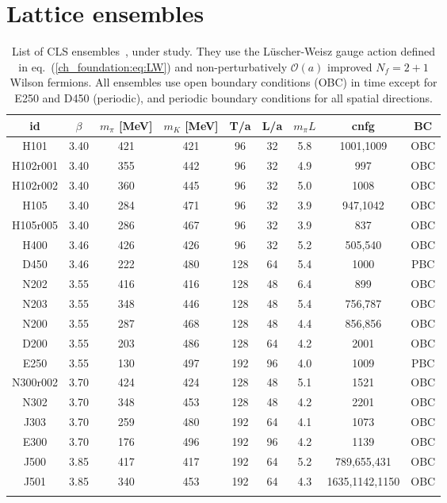 
\chapter{Lattice ensembles}
\label{apex_ensembles}

\begin{longtable}{c c c c c c c c c}
\label{apex_ensembles:tab:ens}
    id & $\beta$ & $m_{\pi}$ [MeV] & $m_K$ [MeV] & T/a & L/a & $m_{\pi}L$ & cnfg & BC\\
    \toprule
    H101 & 3.40 & 421 & 421 & 96 & 32 & 5.8 & 1001,1009 & OBC \\
    H102r001 & 3.40 & 355 & 442 & 96 & 32 & 4.9 & 997 & OBC \\
    H102r002 & 3.40 & 360 & 445 & 96 & 32 & 5.0 & 1008 & OBC \\
    H105 & 3.40 & 284 & 471 & 96 & 32 & 3.9 & 947,1042 & OBC \\
    H105r005 & 3.40 & 286 & 467 & 96 & 32 & 3.9 & 837 & OBC \\
\midrule
    H400 & 3.46 & 426 & 426 & 96 & 32 & 5.2 & 505,540 & OBC \\
    D450 & 3.46 & 222 & 480 & 128 & 64 & 5.4 & 1000 & PBC \\
\midrule
    N202 & 3.55 & 416 & 416 & 128 & 48 & 6.4 & 899 & OBC \\
    N203 & 3.55 & 348 & 446 & 128 & 48 & 5.4 & 756,787 & OBC \\
    N200 & 3.55 & 287 & 468 & 128 & 48 & 4.4 & 856,856 & OBC \\
    D200 & 3.55 & 203 & 486 & 128 & 64 & 4.2 & 2001 & OBC \\
    E250 & 3.55 & 130 & 497 & 192 & 96 & 4.0 & 1009 & PBC\\
\midrule
    N300r002 & 3.70 & 424 & 424 & 128 & 48 & 5.1 & 1521 & OBC \\
    N302 & 3.70 & 348 & 453 & 128 & 48 & 4.2 & 2201 & OBC \\
    J303 & 3.70 & 259 & 480 & 192 & 64 & 4.1 & 1073 & OBC \\
    E300 & 3.70 & 176 & 496 & 192 & 96 & 4.2 & 1139 & OBC \\ 
\midrule
    J500 & 3.85 & 417 & 417 & 192 & 64 & 5.2 & 789,655,431 & OBC \\
    J501 & 3.85 & 340 & 453 & 192 & 64 & 4.3 & 1635,1142,1150 & OBC \\
    \bottomrule
    \caption{List of CLS ensembles~\citep{Bruno:2014jqa},\citep{Mohler:2017wnb} under study. They use the Lüscher-Weisz gauge action defined in eq.~(\ref{ch_foundation:eq:LW}) and non-perturbatively $\mathcal{O}(a)$ improved $N_f=2+1$ Wilson fermions. All ensembles use open boundary conditions (OBC) in time except for E250 and D450 (periodic), and periodic boundary conditions for all spatial directions.}
\end{longtable}



